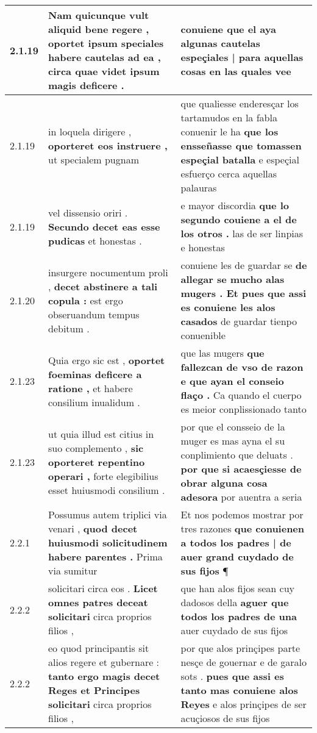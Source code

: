 \begin{tabular}{|p{1cm}|p{6.5cm}|p{6.5cm}|}
2.1.19 & Nam quicunque vult aliquid bene regere , \textbf{ oportet ipsum speciales habere cautelas ad ea , } circa quae videt ipsum magis deficere . & conuiene \textbf{ que el aya algunas cautelas espeçiales | para aquellas cosas } en las quales vee \\\hline
2.1.19 & in loquela dirigere , \textbf{ oporteret eos instruere , } ut specialem pugnam & que qualiesse enderesçar los tartamudos en la fabla conuenir le ha \textbf{ que los ensseñasse que tomassen espeçial batalla } e espeçial esfuerço cerca aquellas palauras \\\hline
2.1.19 & vel dissensio oriri . \textbf{ Secundo decet eas esse pudicas } et honestas . & e mayor discordia \textbf{ que lo segundo couiene a el de los otros . } las de ser linpias e honestas \\\hline
2.1.20 & insurgere nocumentum proli , \textbf{ decet abstinere a tali copula : } est ergo obseruandum tempus debitum . & conuiene les de guardar se \textbf{ de allegar se mucho alas mugers . Et pues que assi es conuiene les alos casados } de guardar tienpo conuenible \\\hline
2.1.23 & Quia ergo sic est , \textbf{ oportet foeminas deficere a ratione , } et habere consilium inualidum . & que las mugers \textbf{ que fallezcan de vso de razon e que ayan el conseio flaço . } Ca quando el cuerpo es meior conplissionado tanto \\\hline
2.1.23 & ut quia illud est citius in suo complemento , \textbf{ sic oporteret repentino operari , } forte elegibilius esset huiusmodi consilium . & por que el consseio de la muger es mas ayna el su conplimiento que deluats . \textbf{ por que si acaesçiesse de obrar alguna cosa adesora } por auentra a seria \\\hline
2.2.1 & Possumus autem triplici via venari , \textbf{ quod decet huiusmodi solicitudinem habere parentes . } Prima via sumitur & Et nos podemos mostrar por tres razones \textbf{ que conuienen a todos los padres | de auer grand cuydado de sus fijos } ¶ \\\hline
2.2.2 & solicitari circa eos . \textbf{ Licet omnes patres deceat solicitari } circa proprios filios , & que han alos fijos sean cuy dadosos della \textbf{ aguer que todos los padres de una } auer cuydado de sus fijos \\\hline
2.2.2 & eo quod principantis sit alios regere et gubernare : \textbf{ tanto ergo magis decet Reges et Principes solicitari } circa proprios filios , & por que alos prinçipes parte nesçe de gouernar e de garalo sots . \textbf{ pues que assi es tanto mas conuiene alos Reyes } e alos prinçipes de ser acuçiosos de sus fijos \\\hline

\end{tabular}
